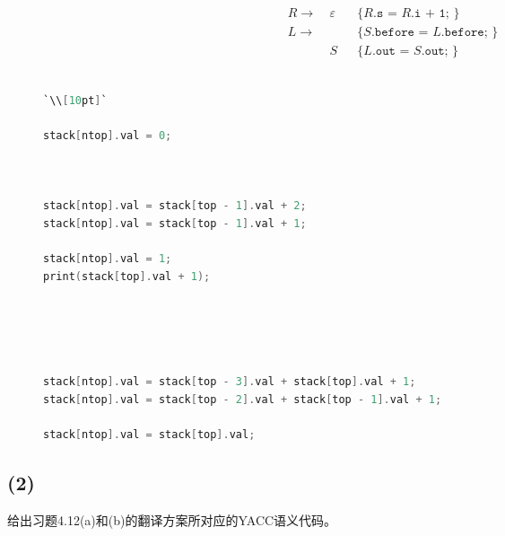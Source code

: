 \documentclass{article}
\begin{document}
\begin{figure}[H]
\begin{multicols}{2}
\begin{align*}
        R \rightarrow\  &\varepsilon&& \texttt{\{ }R\texttt{.s = }R\texttt{.i + 1; \}} \\
        L \rightarrow\  & && \texttt{\{ }S\texttt{.before = }L\texttt{.before; \}} \\
                        &S&& \texttt{\{ }L\texttt{.out = }S\texttt{.out; \}}
    \end{align*}
    \\[7pt]
    \begin{lstlisting}[language = C,
        keywordstyle=\bfseries\color{blue!70},
        commentstyle=\color{white!80!black},
        frame=shadowbox,
        framerule = 1pt,
        xleftmargin = 2mm,
        rulesepcolor = \color{white},
        rulecolor = \color{white},
        basicstyle=\ttfamily\scriptsize,
        lineskip = 15pt,
        escapeinside=``]
`\\[10pt]`

stack[ntop].val = 0;



stack[ntop].val = stack[top - 1].val + 2;
stack[ntop].val = stack[top - 1].val + 1;

stack[ntop].val = 1;
print(stack[top].val + 1);





stack[ntop].val = stack[top - 3].val + stack[top].val + 1;
stack[ntop].val = stack[top - 2].val + stack[top - 1].val + 1;

stack[ntop].val = stack[top].val;
    \end{lstlisting}
    \end{multicols}
\end{figure}


\subsection*{(2)}
给出习题4.12(a)和(b)的翻译方案所对应的YACC语义代码。
\end{document}
